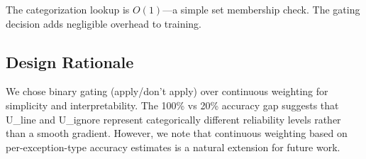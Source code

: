 The categorization lookup is $O(1)$---a simple set membership check. The gating decision adds negligible overhead to training.

\subsection{Design Rationale}

We chose binary gating (apply/don't apply) over continuous weighting for simplicity and interpretability. The 100\% vs 20\% accuracy gap suggests that U\_line and U\_ignore represent categorically different reliability levels rather than a smooth gradient. However, we note that continuous weighting based on per-exception-type accuracy estimates is a natural extension for future work.
